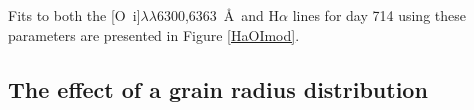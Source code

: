 Fits to both the [O~{\sc i}]$\lambda\lambda$6300,6363~\AA\ and H$\alpha$ lines for day 714 using these parameters are presented in Figure \ref{HaOImod}.


\subsection{The effect of a grain radius distribution}
\label{gs_distn}

%
%
%
 
%



%
%

